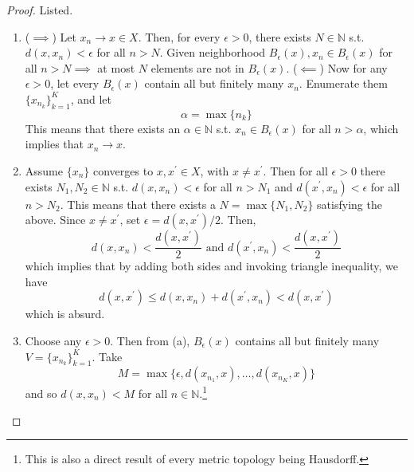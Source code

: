   \begin{proof}
    Listed. 
    \begin{enumerate}
      \item ($\implies$) Let $x_n \rightarrow x \in X$. Then, for every $\epsilon > 0$, there exists $N \in \mathbb{N}$ s.t. $d(x, x_n) < \epsilon$ for all $n > N$. Given neighborhood $B_\epsilon (x), x_n \in B_\epsilon (x)$ for all $n > N \implies$ at most $N$ elements are not in $B_\epsilon (x)$. ($\impliedby$) Now for any $\epsilon > 0$, let every $B_\epsilon (x)$ contain all but finitely many $x_n$. Enumerate them $\{x_{n_k}\}_{k=1}^K$, and let 
      \begin{equation}
        \alpha = \max \{n_k\}
      \end{equation}
      This means that there exists an $\alpha \in \mathbb{N}$ s.t. $x_n \in B_\epsilon (x)$ for all $n > \alpha$, which implies that $x_n \rightarrow x$. 

      \item Assume $\{x_n\}$ converges to $x, x^\prime \in X$, with $x \neq x^\prime$. Then for all $\epsilon > 0$ there exists $N_1, N_2 \in \mathbb{N}$ s.t. $d(x, x_n) < \epsilon$ for all $n > N_1$ and $d(x^\prime, x_n) < \epsilon$ for all $n > N_2$. This means that there exists a $N = \max\{N_1, N_2\}$ satisfying the above. Since $x \neq x^\prime$, set $\epsilon = d(x, x^\prime) /2$. Then, 
      \begin{equation}
        d(x, x_n) < \frac{d(x, x^\prime)}{2} \text{ and } d(x^\prime, x_n) < \frac{d(x, x^\prime)}{2}
      \end{equation}
      which implies that by adding both sides and invoking triangle inequality, we have 
      \begin{equation}
        d(x, x^\prime) \leq d(x, x_n) + d(x^\prime, x_n) < d(x, x^\prime)
      \end{equation}
      which is absurd. 

      \item Choose any $\epsilon > 0$. Then from (a), $B_\epsilon (x)$ contains all but finitely many $V = \{x_{n_k}\}_{k=1}^K$. Take 
      \begin{equation}
        M = \max \{\epsilon, d(x_{n_1}, x), \ldots, d(x_{n_K}, x)\}
      \end{equation}
      and so $d(x, x_n) < M$ for all $n \in \mathbb{N}$.\footnote{This is also a direct result of every metric topology being Hausdorff.}


\end{enumerate}
\end{proof}
